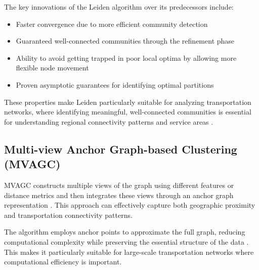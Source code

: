 The key innovations of the Leiden algorithm over its predecessors include:
\begin{itemize}
    \item Faster convergence due to more efficient community detection
    \item Guaranteed well-connected communities through the refinement phase
    \item Ability to avoid getting trapped in poor local optima by allowing more flexible node movement
    \item Proven asymptotic guarantees for identifying optimal partitions
\end{itemize}

These properties make Leiden particularly suitable for analyzing transportation networks, where identifying meaningful, well-connected communities is essential for understanding regional connectivity patterns and service areas .

\subsection{Multi-view Anchor Graph-based Clustering (MVAGC)}
\label{subsec:MVAGC}

MVAGC constructs multiple views of the graph using different features or distance metrics and then integrates these views through an anchor graph representation . This approach can effectively capture both geographic proximity and transportation connectivity patterns.

The algorithm employs anchor points to approximate the full graph, reducing computational complexity while preserving the essential structure of the data . This makes it particularly suitable for large-scale transportation networks where computational efficiency is important.

